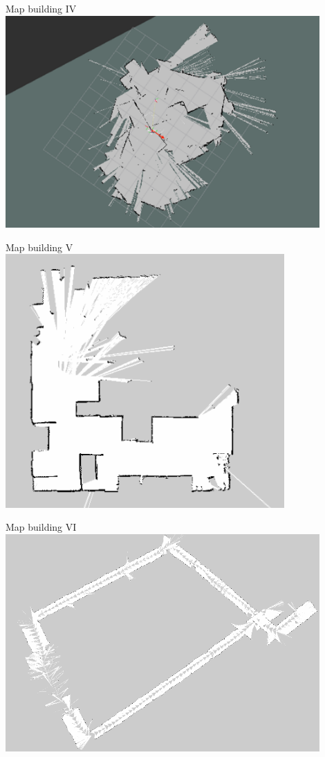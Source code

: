 \begin{frame}{Map building IV}
    \centering
    \includegraphics[width=0.9\textwidth]{gfx/map_messy.png}
\end{frame}
\begin{frame}{Map building V}
\centering
\includegraphics[width=0.8\textwidth]{gfx/map.png}
\end{frame}
\begin{frame}{Map building VI}
\centering
\includegraphics[width=0.9\textwidth]{gfx/floor.png}
\end{frame}

